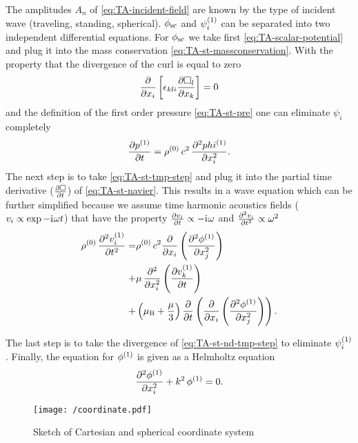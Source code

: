 The amplitudes $A_{n}$ of \cref{eq:TA-incident-field} are known by the type of 
incident wave (traveling, standing, spherical). $\phi_{\mathrm{sc}}$ and 
$\psi_{i}^{(1)}$ can be separated into two independent differential 
equations. For $\phi_{\mathrm{sc}}$ we take first \cref{eq:TA-scalar-potential} 
and plug it into the mass conservation \cref{eq:TA-st-massconservation}. With 
the property that the divergence of the curl is equal to zero
\begin{equation}
  \pdv{x_{i}}\left[\epsilon_{kli}\pdv{\Box_{l}}{x_{k}}\right] = 0
\end{equation}
and the definition of the first order pressure \cref{eq:TA-st-pre} one can 
eliminate $\psi_{i}$ completely
\begin{equation}
  \pdv{  p^{(1)}  }{t} = 
  \rho^{(0)}\,c^{2}\,\pdv[2]{  phi^{(1)}  }{x_{i}}.
  \label{eq:TA-st-tmp-step}
\end{equation}
The next step is to take \cref{eq:TA-st-tmp-step} and plug it into the partial 
time derivative ($\pdv{\Box}{t}$) of \cref{eq:TA-st-navier}. This results in a 
wave equation which can be further simplified because we assume time harmonic 
acoustics fields ($v_{i}\propto\exp -\mathrm{i}\mkern1mu\omega t$) that have the property 
$\pdv{v_{i}}{t}\propto -\mathrm{i}\mkern1mu\omega$ and
$\pdv[2]{v_{i}}{t}\propto \omega^{2}$
\begin{equation}
  \label{eq:TA-st-nd-tmp-step}
\begin{split}
  \rho^{(0)}\,\pdv[2]{  v_{i}^{(1)}  }{t} = & 
  \rho^{(0)}\,c^{2}\pdv{x_{i}}\left( \pdv[2]{  \phi^{(1)}  }{x_{j}} 
  \right) \\
  + & \mu\,\pdv[2]{x_{i}}\left( \pdv{  v_{k}^{(1)}  }{t} \right) \\
    + & \left(\mu_{\mathrm{B}} + \frac{\mu}{3}\right)\pdv{t}
    \left( \pdv{x_{i}}\left( \pdv[2]{  \phi^{(1)}  }{x_{j}} \right) \right).
\end{split}
\end{equation}

The last step is to take the divergence of \cref{eq:TA-st-nd-tmp-step} to 
eliminate $\psi_{i}^{(1)}$. Finally, the equation for $\phi^{(1)}$ is 
given as a Helmholtz equation
\begin{equation}
  \pdv[2]{  \phi^{(1)}  }{x_{i}} + k^{2}\,\phi^{(1)} = 0.
  \label{eq:TA-st-phi}
\end{equation}

\begin{figure}[tbp]
  \centering
  \texttt{[image: /coordinate.pdf]}
  \caption{Sketch of Cartesian and spherical coordinate system}
  \label{fig:TA-coordinate}
\end{figure}

